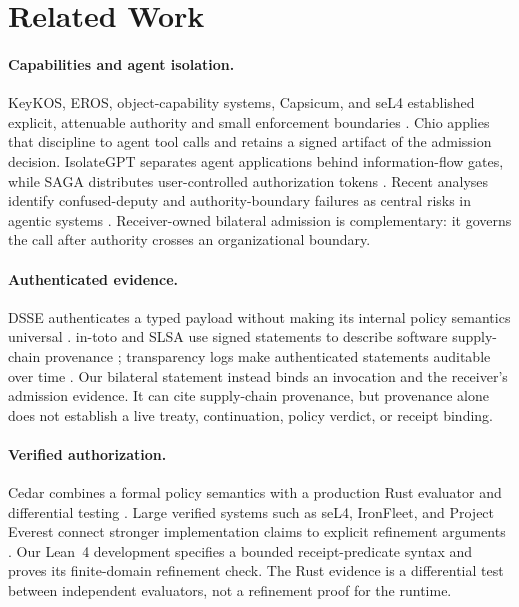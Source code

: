 \section{Related Work}

\paragraph{Capabilities and agent isolation.}
KeyKOS, EROS, object-capability systems, Capsicum, and seL4 established
explicit, attenuable authority and small enforcement boundaries
\cite{hardy1985keykos,shapiro1999eros,miller2006composition,murray2010ocap,watson2010capsicum,klein2009sel4}.
Chio applies that discipline to agent tool calls and retains a signed artifact
of the admission decision. IsolateGPT separates agent applications behind
information-flow gates, while SAGA distributes user-controlled authorization
tokens \cite{isolategptNDSS2025,sagaNDSS2025}. Recent analyses identify
confused-deputy and authority-boundary failures as central risks in agentic
systems \cite{agenticFoundations2025}. Receiver-owned bilateral admission is
complementary: it governs the call after authority crosses an organizational
boundary.

\paragraph{Authenticated evidence.}
DSSE authenticates a typed payload without making its internal policy
semantics universal \cite{dsse}. in-toto and SLSA use signed statements to
describe software supply-chain provenance
\cite{torres2019intoto,slsa}; transparency logs make authenticated statements
auditable over time \cite{rfc9162,sigstoreSecurity}. Our bilateral statement
instead binds an invocation and the receiver's admission evidence. It can cite
supply-chain provenance, but provenance alone does not establish a live treaty,
continuation, policy verdict, or receipt binding.

\paragraph{Verified authorization.}
Cedar combines a formal policy semantics with a production Rust evaluator and
differential testing \cite{cedarOOPSLA2024,cedarFSE2024}. Large verified
systems such as seL4, IronFleet, and Project Everest connect stronger
implementation claims to explicit refinement arguments
\cite{klein2009sel4,hawblitzel2015ironfleet,projectEverest}. Our Lean~4
development \cite{demoura2021lean4} specifies a bounded receipt-predicate
syntax and proves its finite-domain refinement check. The Rust evidence is a
differential test between independent evaluators, not a refinement proof for
the runtime.

